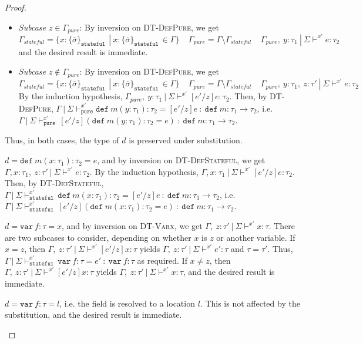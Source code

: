 \documentclass{llncs}
\newcommand{\keywadj}[1]{\mathtt{#1}}
\newcommand{\keyw}[1]{\keywadj{#1}~}
\newcommand{\pcase}[1][]{
  \if\relax\detokenize{#1}\relax
    \def\thiscase{}
  \else
    \def\thiscase{~#1}
  \fi
  \item
}
\begin{document}
\begin{proof}
\begin{pcases}
\begin{itemize}
\item[] \textit{Subcase $z \in \Gamma_{pure}$}: By inversion on \textsc{DT-DefPure}, we get
\[
\Gamma_{stateful} = \{x : \{ \overline{\sigma} \}_{\keyw{stateful}} ~|~ x : \{ \overline{\sigma} \}_{\keyw{stateful}} \in \Gamma\}~~~~~\Gamma_{pure} = \Gamma \setminus \Gamma_{stateful}~~~~~\Gamma_{pure},~y : \tau_1~|~\Sigma \vdash^{x'} e : \tau_2
\]
and the desired result is immediate.

\item[] \textit{Subcase $z \not\in \Gamma_{pure}$}: By inversion on \textsc{DT-DefPure}, we get
\[
\Gamma_{stateful} = \{x : \{ \overline{\sigma} \}_{\keyw{stateful}} ~|~ x : \{ \overline{\sigma} \}_{\keyw{stateful}} \in \Gamma\}~~~~~\Gamma_{pure} = \Gamma \setminus \Gamma_{stateful}~~~~~\Gamma_{pure},~y : \tau_1,~z : \tau'~|~\Sigma \vdash^{x'} e : \tau_2
\]
By the induction hypothesis, $\Gamma_{pure},~y : \tau_1~|~\Sigma \vdash^{x'} [e'/z]e : \tau_2$. Then, by \textsc{DT-DefPure}, $\Gamma~|~\Sigma \vdash^{x'}_{\keywadj{pure}} \keyw{def} m(y : \tau_1) : \tau_2 = [e'/z]e~:~\keyw{def} m : \tau_1 \rightarrow \tau_2$, i.e. $\Gamma~|~\Sigma \vdash^{x'}_{\keyw{pure}} [e'/z](\keyw{def} m(y : \tau_1) : \tau_2 = e)~:~\keyw{def} m : \tau_1 \rightarrow \tau_2$.
\end{itemize}

Thus, in both cases, the type of $d$ is preserved under substitution.
\\
\pcase[\textsc{DT-DefStateful}]
$d = \keyw{def} m(x : \tau_1) : \tau_2 = e$, and by inversion on \textsc{DT-DefStateful}, we get $\Gamma, x : \tau_1,~z : \tau'~|~\Sigma \vdash^{x'} e : \tau_2$. By the induction hypothesis, $\Gamma, x : \tau_1~|~\Sigma \vdash^{x'} [e'/z]e : \tau_2$. Then, by \textsc{DT-DefStateful}, $\Gamma~|~\Sigma \vdash^{x'}_{\keyw{stateful}} \keyw{def} m(x : \tau_1) : \tau_2 = [e'/z]e~:~\keyw{def} m : \tau_1 \rightarrow \tau_2$, i.e. $\Gamma~|~\Sigma \vdash^{x'}_{\keyw{stateful}} [e'/z](\keyw{def} m(x : \tau_1) : \tau_2 = e)~:~\keyw{def} m : \tau_1 \rightarrow \tau_2$.
\\
\pcase[\textsc{DT-Varx}]
$d = \keyw{var} f : \tau = x$, and by inversion on \textsc{DT-Varx}, we get $\Gamma,~z : \tau'~|~\Sigma \vdash^{x'} x : \tau$. There are two subcases to consider, depending on whether $x$ is $z$ or another variable. If $x = z$, then $\Gamma,~z : \tau'~|~\Sigma \vdash^{x'} [e'/z]x : \tau$ yields $\Gamma,~z : \tau'~|~\Sigma \vdash^{x'} e' : \tau$ and $\tau = \tau'$. Thus, $\Gamma~|~\Sigma \vdash^{x'}_{\keyw{stateful}} \keyw{var} f : \tau = e'~:~\keyw{var} f : \tau$ as required. If $x \not = z$, then $\Gamma,~z : \tau'~|~\Sigma \vdash^{x'} [e'/z]x : \tau$ yields $\Gamma,~z : \tau'~|~\Sigma \vdash^{x'} x : \tau$, and the desired result is immediate.
\\
\pcase[\textsc{DT-Varl}]
$d = \keyw{var} f : \tau = l$, i.e. the field is resolved to a location $l$. This is not affected by the substitution, and the desired result is immediate.


\end{pcases}
\end{proof}
\end{document}
